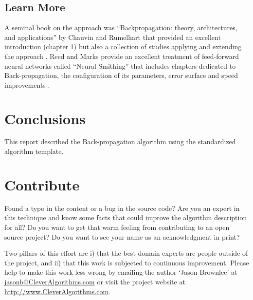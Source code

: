 \documentclass[a4paper, 11pt]{article}
\makeatletter
\newcommand{\myreportauthor}{Jason Brownlee}
\newcommand{\myreportemail}{jasonb@CleverAlgorithms.com}
\newcommand{\myreportwebsite}{http://www.CleverAlgorithms.com}
\makeatother
\begin{document}
% 
% 
\subsection{Learn More}
A seminal book on the approach was ``Backpropagation: theory, architectures, and applications'' by Chauvin and Rumelhart that provided an excellent introduction (chapter 1) but also a collection of studies applying and extending the approach \cite{Chauvin1995}.
Reed and Marks provide an excellent treatment of feed-forward neural networks called ``Neural Smithing'' that includes chapters dedicated to Back-propagation, the configuration of its parameters, error surface and speed improvements \cite{Reed1999}.

% 
% 
\section{Conclusions}
\label{sec:conclusions}
This report described the Back-propagation algorithm using the standardized algorithm template.

% 
% 
\section{Contribute}
\label{sec:contribute}
Found a typo in the content or a bug in the source code? 
Are you an expert in this technique and know some facts that could improve the algorithm description for all?
Do you want to get that warm feeling from contributing to an open source project? 
Do you want to see your name as an acknowledgment in print?

Two pillars of this effort are i) that the best domain experts are people outside of the project, and ii) that this work is subjected to continuous improvement. 
Please help to make this work less wrong by emailing the author `\myreportauthor' at \url{\myreportemail} or visit the project website at \url{\myreportwebsite}.



\end{document}

